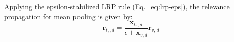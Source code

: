 

Applying the epsilon-stabilized LRP rule (Eq.~\ref{eq:lrp-eps}), the relevance propagation for mean pooling is given by:
\begin{equation}
    \mathbf{r}_{t_v,d} = \frac{\mathbf{x}_{t_v,d}}{\epsilon + \mathbf{x}_{v,d}} \mathbf{r}_{v,d}
    \label{eq:lrp-meanpool}
\end{equation}




